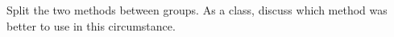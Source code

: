 \documentclass[handout,instructornotes]{ximera}
\begin{document}
\begin{instructorNotes}
Split the two methods between groups.  As a class, discuss which method was better to use in this circumstance.
\end{instructorNotes}



















	
	
	
	
	
	
	
	
	

	










								
				
				
	
\end{document}
